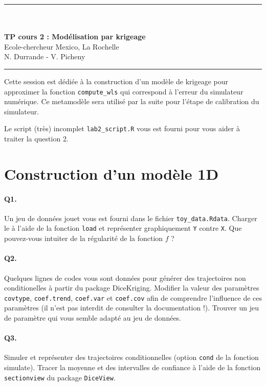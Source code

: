\documentclass[12pt]{scrartcl}
\begin{document}
\begin{center}
	\rule{\textwidth}{1pt}
	\\ \ \\
	{\LARGE \textbf{TP cours 2 : Modélisation par krigeage}}\\
	\vspace{3mm}
	{\large Ecole-chercheur Mexico, La Rochelle \\ \vspace{3mm}}
	{\normalsize N. Durrande - V. Picheny}\\
	\vspace{3mm}
	\rule{\textwidth}{1pt}
	\vspace{5mm}
\end{center}
Cette session est dédiée à la construction d'un modèle de krigeage pour approximer la fonction  \texttt{compute\_wls} qui correspond à l'erreur du simulateur numérique. Ce metamodèle sera utilisé par la suite pour l'étape de calibration du simulateur.

Le script (très) incomplet \texttt{lab2\_script.R} vous est fourni pour vous aider à traiter la question 2.
\section{Construction d'un modèle 1D}

\paragraph{Q1.} Un jeu de données jouet vous est fourni dans le fichier \texttt{toy\_data.Rdata}. Charger le à l'aide de la fonction \texttt{load} et représenter graphiquement \texttt{Y} contre \texttt{X}. Que pouvez-vous intuiter de la régularité de la fonction $f$ ?

\paragraph{Q2.} Quelques lignes de codes vous sont données pour générer des trajectoires non conditionelles à partir du package DiceKriging. Modifier la valeur des paramètres \texttt{covtype}, \texttt{coef.trend}, \texttt{coef.var} et \texttt{coef.cov} afin de comprendre l'influence de ces paramètres (il n'est pas interdit de consulter la documentation !). Trouver un jeu de paramètre qui vous semble adapté au jeu de données.

\paragraph{Q3.} Simuler et représenter des trajectoires conditionnelles (option \texttt{cond} de la fonction simulate). Tracer la moyenne et des intervalles de confiance à l'aide de la fonction \texttt{sectionview} du package \texttt{DiceView}.
\end{document}
